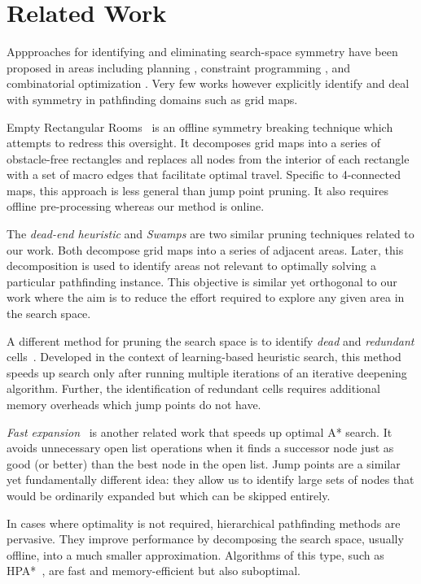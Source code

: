 \section{Related Work}
\label{sec:relatedwork}
 Appproaches for identifying and eliminating search-space symmetry have been
proposed in areas including planning \cite{fox99}, constraint programming
\cite{gent00}, and combinatorial optimization \cite{fukunaga08}. 
Very few works however explicitly identify and deal with symmetry in pathfinding
domains such as grid maps. 

Empty Rectangular Rooms~\cite{harabor10} is an offline symmetry breaking technique
which attempts to redress this oversight. 
It decomposes grid maps into a series of obstacle-free rectangles and replaces all nodes 
from the interior of each rectangle with 
a set of macro edges that facilitate optimal travel. 
Specific to 4-connected maps, this approach is less general than
jump point pruning. It also requires offline pre-processing whereas our
method is online.

The \emph{dead-end heuristic} \cite{bjornsson06} and \emph{Swamps} \cite{pochter10}
are two similar pruning techniques related to our work.
Both decompose grid maps into a series of adjacent areas. Later, this decomposition
is used to identify areas not relevant to optimally solving a particular
pathfinding instance.
This objective is similar yet orthogonal to our work where
the aim is to reduce the effort required to explore any given area in the search
space.

A different method for pruning the search space is to identify \emph{dead} and
\emph{redundant} cells~\cite{sturtevant10}.  Developed in the context of
learning-based heuristic search, this method speeds up search only after running
multiple iterations of an iterative deepening algorithm.  Further, the
identification of redundant cells requires additional memory overheads which
jump points do not have.

\emph{Fast expansion}~\cite{sun09} is another related work that speeds up
optimal A* search. It avoids unnecessary open list operations when it finds a
successor node just as good (or better) than the best node in the open list.
Jump points are a similar yet fundamentally different idea: they allow us to
identify large sets of nodes that would be ordinarily expanded but which can be
skipped entirely.
 
In cases where optimality is not required, hierarchical pathfinding methods
are pervasive.  They improve performance by decomposing the
search space, usually offline, into a much smaller approximation.  Algorithms
of this type, such as HPA*~\cite{botea04}, are  fast and
memory-efficient but also suboptimal.
